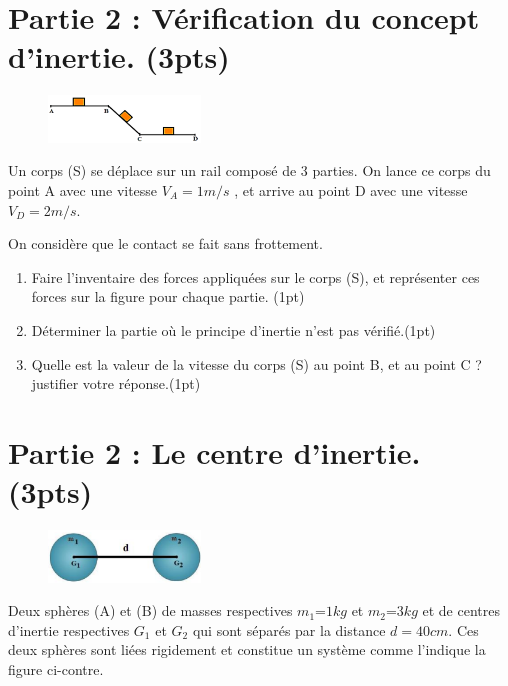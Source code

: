 \documentclass[12pt]{article}
\begin{document}
\section*{Partie 2 : Vérification du concept d'inertie. \dotfill(3pts)}

\begin{figure}
	\vspace{-0.8cm}
	\includegraphics[width=0.36\textwidth]{./img/last.png}
\end{figure}


Un corps (S) se déplace sur un rail composé de 3 parties. On
lance ce corps du point A avec une vitesse $V_A=1m/s$ , et arrive au point D avec une vitesse $V_D=2m/s$. 

On considère que le contact se fait sans frottement.

\begin{enumerate}
	\item Faire l’inventaire des forces appliquées sur le corps (S), et représenter ces forces sur la figure pour
chaque partie. \dotfill(1pt)
\item Déterminer la partie où le principe d’inertie n’est pas vérifié.\dotfill(1pt)
\item Quelle est la valeur de la vitesse du corps (S) au point B, et au point C ? justifier votre réponse.\dotfill(1pt)
\end{enumerate}

\section*{Partie 2 : Le centre d'inertie. \dotfill(3pts)}

\begin{figure}
	\vspace{-0.8cm}
	\includegraphics[width=0.36\textwidth]{./img/ex3.png}
\end{figure}


Deux sphères (A) et (B) de masses respectives $m_1$=$1kg$ et $m_2$=$3kg$ et de centres d’inertie respectives $G_1$ et $G_2$ qui sont séparés par la distance $d = 40 cm$. Ces deux sphères sont liées rigidement et constitue un système comme l’indique la figure ci-contre.
\end{document}
